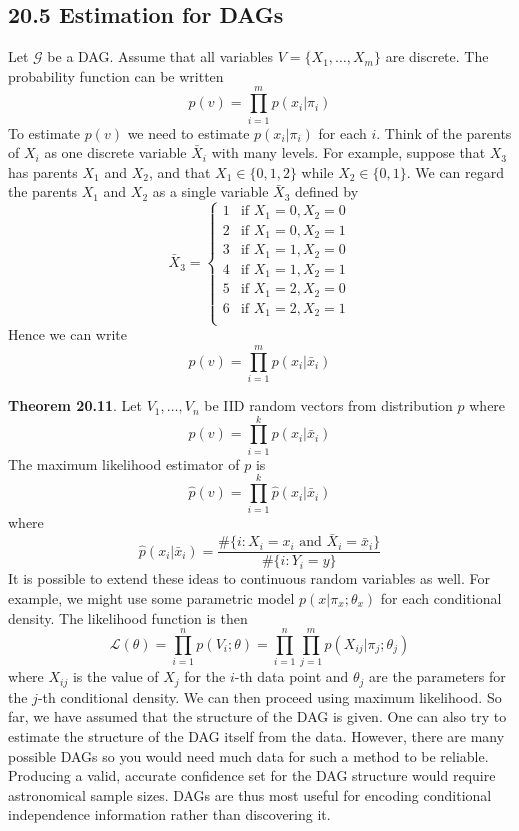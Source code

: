 \subsection*{20.5 Estimation for DAGs}\label{estimation-for-dags}
Let \(\mathcal{G}\) be a DAG. Assume that all variables
\(V = \{ X_{1}, \dots, X_m \}\) are discrete. The probability function can
be written
\[
p(v) = \prod_{i=1}^m p(x_{i} | \pi_{i})
\]
To estimate \(p(v)\) we need to estimate \(p(x_{i} | \pi_{i})\) for each
\(i\). Think of the parents of \(X_{i}\) as one discrete variable
\(\bar{X}_{i}\) with many levels. For example, suppose that \(X_{3}\)
has parents \(X_{1}\) and \(X_{2}\), and that \(X_{1} \in \{ 0, 1, 2 \}\)
while \(X_{2} \in \{ 0, 1 \}\). We can regard the parents \(X_{1}\) and
\(X_{2}\) as a single variable \(\bar{X}_{3}\) defined by
\[
\bar{X}_{3} = \begin{cases}
1 & \text{if } X_{1} = 0, X_{2} = 0\\
2 & \text{if } X_{1} = 0, X_{2} = 1\\
3 & \text{if } X_{1} = 1, X_{2} = 0\\
4 & \text{if } X_{1} = 1, X_{2} = 1\\
5 & \text{if } X_{1} = 2, X_{2} = 0\\
6 & \text{if } X_{1} = 2, X_{2} = 1\\
\end{cases}
\]
Hence we can write
\[
p(v) = \prod_{i=1}^m p(x_{i} | \bar{x}_{i})
\]

\textbf{Theorem 20.11}. Let \(V_{1}, \dots, V_{n}\) be IID random vectors
from distribution \(p\) where
\[
p(v) = \prod_{i=1}^{k} p(x_{i} | \bar{x}_{i})
\]
The maximum likelihood estimator of \(p\) is
\[
\hat{p}(v) = \prod_{i=1}^{k} \hat{p}(x_{i} | \bar{x}_{i})
\]
where
\[
\hat{p}(x_{i} | \bar{x}_{i}) = \frac{\# \{i : X_{i} = x_{i} \text{ and } \bar{X}_{i} = \bar{x}_{i} \}}{\# \{i : Y_{i} = y \}}
\]
It is possible to extend these ideas to continuous random variables as
well. For example, we might use some parametric model
\(p(x | \pi_x; \theta_x)\) for each conditional density. The likelihood
function is then
\[
\mathcal{L}(\theta) = \prod_{i=1}^{n} p(V_{i}; \theta) = \prod_{i=1}^{n} \prod_{j=1}^m p(X_{ij} | \pi_{j}; \theta_{j})
\]
where \(X_{ij}\) is the value of \(X_{j}\) for the \(i\)-th data point and
\(\theta_{j}\) are the parameters for the \(j\)-th conditional density. We
can then proceed using maximum likelihood.
So far, we have assumed that the structure of the DAG is given. One can
also try to estimate the structure of the DAG itself from the data.
However, there are many possible DAGs so you would need much data for
such a method to be reliable. Producing a valid, accurate confidence set
for the DAG structure would require astronomical sample sizes. DAGs are
thus most useful for encoding conditional independence information
rather than discovering it.

